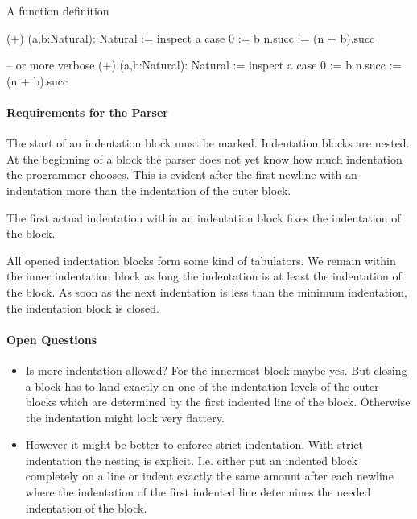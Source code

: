 A function definition
\begin{alba}
  (+) (a,b:Natural): Natural :=
    inspect a case
      0 := b
      n.succ :=
        (n + b).succ

  -- or more verbose
  (+) (a,b:Natural): Natural :=
    inspect
      a
    case
      0 := b
      n.succ :=
        (n + b).succ
\end{alba}


\paragraph{Requirements for the Parser}
The start of an indentation block must be marked. Indentation blocks are
nested. At the beginning of a block the parser does not yet know how much
indentation the programmer chooses. This is evident after the first newline
with an indentation more than the indentation of the outer block.

The first actual indentation within an indentation block fixes the indentation
of the block.

All opened indentation blocks form some kind of tabulators. We remain within
the inner indentation block as long the indentation is at least the
indentation of the block. As soon as the next indentation is less than the
minimum indentation, the indentation block is closed.


\paragraph{Open Questions}
\begin{itemize}
\item Is more indentation allowed? For the innermost block maybe yes. But
  closing a block has to land exactly on one of the indentation levels of the
  outer blocks which are determined by the first indented line of the
  block. Otherwise the indentation might look very flattery.

\item 
  However it might be better to enforce strict indentation. With strict
  indentation the nesting is explicit. I.e. either put an indented block
  completely on a line or indent exactly the same amount after each newline
  where the indentation of the first indented line determines the needed
  indentation of the block.
\end{itemize}

